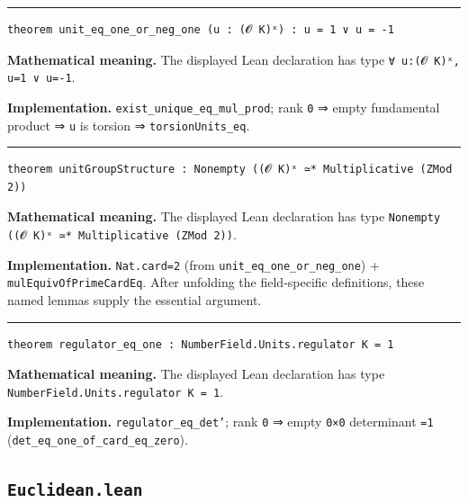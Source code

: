 \documentclass[UTF8,a4paper,11pt,fontset=fandol]{ctexart}
\theoremstyle{definition}
\newcommand{\statementsep}{\par\medskip\hrule\medskip}
\begin{document}
\statementsep
\begin{verbatim}
theorem unit_eq_one_or_neg_one (u : (𝓞 K)ˣ) : u = 1 ∨ u = -1
\end{verbatim}
\noindent\textbf{Mathematical meaning.} The displayed Lean declaration has type \texttt{∀ u:(𝓞 K)ˣ, u=1 ∨ u=-1}.\par
\noindent\textbf{Implementation.} \texttt{exist\_\allowbreak{}unique\_\allowbreak{}eq\_\allowbreak{}mul\_\allowbreak{}prod}; rank \texttt{0} ⇒ empty fundamental product ⇒ \texttt{u} is torsion ⇒ \texttt{torsionUnits\_\allowbreak{}eq}.\par
\statementsep
\begin{verbatim}
theorem unitGroupStructure : Nonempty ((𝓞 K)ˣ ≃* Multiplicative (ZMod 2))
\end{verbatim}
\noindent\textbf{Mathematical meaning.} The displayed Lean declaration has type \texttt{Nonempty ((𝓞 K)ˣ ≃* Multiplicative (ZMod 2))}.\par
\noindent\textbf{Implementation.} \texttt{Nat.\allowbreak{}card=2} (from \texttt{unit\_\allowbreak{}eq\_\allowbreak{}one\_\allowbreak{}or\_\allowbreak{}neg\_\allowbreak{}one}) + \texttt{mulEquivOfPrimeCardEq}. After unfolding the field-specific definitions, these named lemmas supply the essential argument.\par
\statementsep
\begin{verbatim}
theorem regulator_eq_one : NumberField.Units.regulator K = 1
\end{verbatim}
\noindent\textbf{Mathematical meaning.} The displayed Lean declaration has type \texttt{NumberField.\allowbreak{}Units.\allowbreak{}regulator K = 1}.\par
\noindent\textbf{Implementation.} \texttt{regulator\_\allowbreak{}eq\_\allowbreak{}det'}; rank \texttt{0} ⇒ empty \texttt{0×0} determinant \texttt{=1} (\texttt{det\_\allowbreak{}eq\_\allowbreak{}one\_\allowbreak{}of\_\allowbreak{}card\_\allowbreak{}eq\_\allowbreak{}zero}).\par

\subsection{\texttt{Euclidean.lean}}
\end{document}
